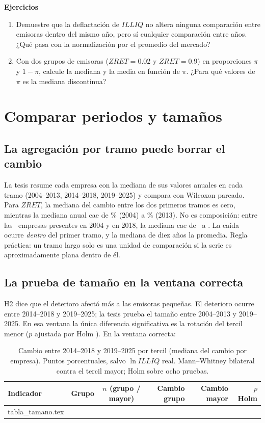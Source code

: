 \documentclass[11pt,letterpaper]{article}
\makeatletter
\newcommand{\tablainput}[1]{\@@input #1.tex }
\theoremstyle{definition}
\theoremstyle{plain}
\newenvironment{ejercicios}{\par\medskip\textbf{Ejercicios}\begin{enumerate}[label=\arabic*.,leftmargin=*]\small}{\end{enumerate}}
\newcommand{\ILLIQ}{\mathit{ILLIQ}}
\newcommand{\ZRET}{\mathit{ZRET}}
\makeatother
\begin{document}
\begin{ejercicios}
\item Demuestre que la deflactación de $\ILLIQ$ no altera ninguna comparación entre emisoras dentro del mismo año, pero sí cualquier comparación entre años. ¿Qué pasa con la normalización por el promedio del mercado?
\item Con dos grupos de emisoras ($\ZRET=0.02$ y $\ZRET=0.9$) en proporciones $\pi$ y $1-\pi$, calcule la mediana y la media en función de $\pi$. ¿Para qué valores de $\pi$ es la mediana discontinua?
\end{ejercicios}

\section{Comparar periodos y tamaños}

\subsection{La agregación por tramo puede borrar el cambio}
La tesis resume cada empresa con la mediana de sus valores anuales en cada tramo (2004--2013, 2014--2018, 2019--2025) y compara con Wilcoxon pareado. Para $\ZRET$, la mediana del cambio entre los dos primeros tramos es cero, mientras la mediana anual cae de \RzMedA\% (2004) a \RzMedTrece\% (2013). No es composición: entre las \RnPermanecen\ empresas presentes en 2004 y en 2018, la mediana cae de \RzPermA\ a \RzPermB. La caída ocurre \emph{dentro} del primer tramo, y la mediana de diez años la promedia. Regla práctica: un tramo largo solo es una unidad de comparación si la serie es aproximadamente plana dentro de él.

\subsection{La prueba de tamaño en la ventana correcta}
H2 dice que el deterioro afectó más a las emisoras pequeñas. El deterioro ocurre entre 2014--2018 y 2019--2025; la tesis prueba el tamaño entre 2004--2013 y 2019--2025. En esa ventana la única diferencia significativa es la rotación del tercil menor ($p$ ajustada por Holm \RrotTunoTres). En la ventana correcta:

\begin{table}[h]\centering\small
\caption{Cambio entre 2014--2018 y 2019--2025 por tercil (mediana del cambio por empresa). Puntos porcentuales, salvo $\ln\ILLIQ$ real. Mann--Whitney bilateral contra el tercil mayor; Holm sobre ocho pruebas.}
\begin{tabular}{@{}llcrrr@{}}\toprule
Indicador & Grupo & $n$ (grupo / mayor) & Cambio grupo & Cambio mayor & $p$ Holm\\\midrule
\tablainput{tabla_tamano}
\bottomrule\end{tabular}
\end{table}
\end{document}
